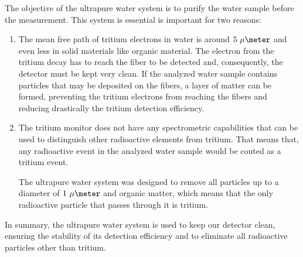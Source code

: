 The objective of the ultrapure water system is to purify the water sample before the measurement. This system is essential is important for two reasons:

\begin{enumerate}

\item{} The mean free path of tritium electrons in water is around $5~\mu\meter$ and even less in solid materials like organic material. The electron from the tritium decay has to reach the fiber to be detected and, consequently, the detector must be kept very clean. If the analyzed water sample contains particles that may be deposited on the fibers, a layer of matter can be formed, preventing the tritium electrons from reaching the fibers and reducing drastically the tritium detection efficiency.

\item{} The tritium monitor does not have any spectrometric capabilities that can be used to distinguish other radioactive elements from tritium. That means that, any radioactive event in the analyzed water sample would be couted as a tritium event.

The ultrapure water system was designed to remove all particles up to a diameter of $1~\mu\meter$ and organic matter, which means that the only radioactive particle that passes through it is tritium. 


\end{enumerate}

In summary, the ultrapure water system is used to keep our detector clean, ensuring the stability of its detection efficiency and to eliminate all radioactive particles other than tritium. %